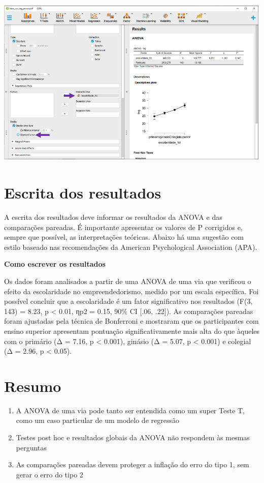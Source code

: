 \documentclass[
]{book}
\providecommand{\tightlist}{%
  \setlength{\itemsep}{0pt}\setlength{\parskip}{0pt}}
\begin{document}
\includegraphics{./img/cap_anova_posthoc_plots2.png}

\hypertarget{escrita-dos-resultados-5}{%
\section{Escrita dos resultados}\label{escrita-dos-resultados-5}}

A escrita dos resultados deve informar os resultados da ANOVA e das comparações pareadas. É importante apresentar os valores de P corrigidos e, sempre que possível, as interpretações teóricas. Abaixo há uma sugestão com estilo baseado nas recomendações da American Psychological Association (APA).

\textbf{Como escrever os resultados}

Os dados foram analisados a partir de uma ANOVA de uma via que verificou o efeito da escolaridade no empreendedorismo, medido por um escala específica. Foi possível concluir que a escolaridade é um fator significativo nos resultados (F(3, 143) = 8.23, p \textless{} 0.01, ηp2 = 0.15, 90\% CI {[}.06, .22{]}). As comparações pareadas foram ajustadas pela técnica de Bonferroni e mostraram que os participantes com ensino superior apresentam pontuação significativamente mais alta do que àqueles com o primário (Δ = 7.16, p \textless{} 0.001), ginásio (Δ = 5.07, p \textless{} 0.001) e colegial (Δ = 2.96, p \textless{} 0.05).

\hypertarget{resumo-9}{%
\section{Resumo}\label{resumo-9}}

\begin{enumerate}
\def\labelenumi{\arabic{enumi}.}
\tightlist
\item
  A ANOVA de uma via pode tanto ser entendida como um super Teste T, como um caso particular de um modelo de regressão\\
\item
  Testes post hoc e resultados globais da ANOVA não respondem às mesmas perguntas\\
\item
  As comparações pareadas devem proteger a inflação do erro do tipo 1, sem gerar o erro do tipo 2\\
\end{enumerate}
\end{document}
